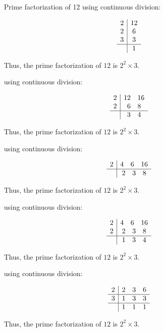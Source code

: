 \documentclass{article}
\begin{document}
Prime factorization of 12 using continuous division:

\[
\begin{array}{c|c}
    2 & 12 \\
    2 & 6  \\
    3 & 3  \\
      \hline
      & 1  
\end{array}
\]

Thus, the prime factorization of \(12\) is \( 2^2 \times 3 \).





 using continuous division:

\[
\begin{array}{c|c}
    2 & 12\ \ \ 16\\
    2 & 6\ \ \  8\\
          \hline
       & 3\ \ \  4\\
\end{array}
\]

Thus, the prime factorization of \(12\) is \( 2^2 \times 3 \).




 using continuous division:

\[
\begin{array}{c|c}
    2 & 4 \ \ \ 6\ \ \ 16\\
    \hline
    &2 \ \ \ 3 \ \ \ 8 \\
\end{array}
\]

Thus, the prime factorization of \(12\) is \( 2^2 \times 3 \).


 using continuous division:

\[
\begin{array}{c|c}
    2 & 4 \ \ \ 6\ \ \ 16\\
    2 & 2 \ \ \ 3\ \ \ 8 \\
              \hline
       & 1 \ \ \ 3\ \ \ 4 \\
\end{array}
\]

Thus, the prime factorization of \(12\) is \( 2^2 \times 3 \).

 using continuous division:

\[
\begin{array}{c|c}
    2 & 2 \ \ \ 3\ \ \ 6\\
    \hline
    3 & 1 \ \ \ 3\ \ \ 3 \\
     \hline
       & 1 \ \ \ 1\ \ \ 1 \\
\end{array}
\]

Thus, the prime factorization of \(12\) is \( 2^2 \times 3 \).
\end{document}
